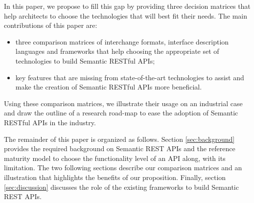 In this paper, we propose to fill this gap by providing three decision matrices that help architects to choose the technologies that will best fit their needs. The main contributions of this paper are:

\begin{itemize}
    \item three comparison matrices of interchange formats, interface description languages and frameworks that help choosing the appropriate set of technologies to build Semantic RESTful APIs;
    \item key features that are missing from state-of-the-art technologies to assist and make the creation of Semantic RESTful APIs more beneficial.
\end{itemize}

Using these comparison matrices, we illustrate their usage on an industrial case and draw the outline of a research road-map to ease the adoption of Semantic RESTful APIs in the industry.

The remainder of this paper is organized as follows. Section \ref{sec:background} provides the required background on Semantic REST APIs and the reference maturity model to choose the functionality level of an API along, with its limitation. The two following sections describe our comparison matrices and an illustration that highlights the benefits of our proposition. Finally, section \ref{sec:discussion} discusses the role of the existing frameworks to build Semantic REST APIs. 
